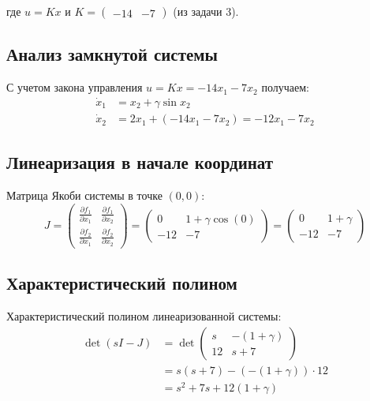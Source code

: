 где $u = Kx$ и $K = \begin{pmatrix} -14 & -7 \end{pmatrix}$ (из задачи 3).

\subsection*{Анализ замкнутой системы}

С учетом закона управления $u = Kx = -14x_1 - 7x_2$ получаем:
\begin{align}
\dot{x}_1 &= x_2 + \gamma \sin x_2 \\
\dot{x}_2 &= 2x_1 + (-14x_1 - 7x_2) = -12x_1 - 7x_2
\end{align}

\subsection*{Линеаризация в начале координат}

Матрица Якоби системы в точке $(0,0)$:
\begin{equation}
J = \begin{pmatrix} 
\frac{\partial f_1}{\partial x_1} & \frac{\partial f_1}{\partial x_2} \\
\frac{\partial f_2}{\partial x_1} & \frac{\partial f_2}{\partial x_2}
\end{pmatrix} = \begin{pmatrix} 
0 & 1 + \gamma \cos(0) \\
-12 & -7
\end{pmatrix} = \begin{pmatrix} 
0 & 1 + \gamma \\
-12 & -7
\end{pmatrix}
\end{equation}

\subsection*{Характеристический полином}

Характеристический полином линеаризованной системы:
\begin{align}
\det(sI - J) &= \det\begin{pmatrix} s & -(1+\gamma) \\ 12 & s+7 \end{pmatrix} \\
&= s(s+7) - (-(1+\gamma)) \cdot 12 \\
&= s^2 + 7s + 12(1+\gamma)
\end{align}


